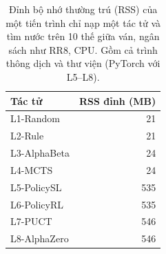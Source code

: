 \begin{table}[H]
  \centering\small
  \caption{Đỉnh bộ nhớ thường trú (RSS) của một tiến trình chỉ nạp một tác tử và tìm nước trên 10 thế giữa ván, ngân sách như RR8, CPU. Gồm cả trình thông dịch và thư viện (PyTorch với L5--L8).}
  \label{tab:ram}
  \setlength{\tabcolsep}{4pt}
  \begin{tabular}{@{}lr@{}}
    \toprule
    Tác tử & RSS đỉnh (MB) \\
    \midrule
    L1-Random & 21 \\
    L2-Rule & 21 \\
    L3-AlphaBeta & 24 \\
    L4-MCTS & 24 \\
    L5-PolicySL & 535 \\
    L6-PolicyRL & 535 \\
    L7-PUCT & 546 \\
    L8-AlphaZero & 546 \\
    \bottomrule
  \end{tabular}
\end{table}
